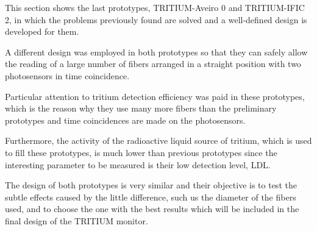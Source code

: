 This section shows the last prototypes, TRITIUM-Aveiro 0 and TRITIUM-IFIC 2, in which the problems previously found are solved and a well-defined design is developed for them.

A different design was employed in both prototypes so that they can safely allow the reading of a large number of fibers arranged in a straight position with two photosensors in time coincidence.

Particular attention to tritium detection efficiency was paid in these prototypes, which is the reason why they use many more fibers than the preliminary prototypes and time coincidences are made on the photosensors.

Furthermore, the activity of the radioactive liquid source of tritium, which is used to fill these prototypes, is much lower than previous prototypes since the interesting parameter to be measured is their low detection level, LDL.

The design of both prototypes is very similar and their objective is to test the subtle effects caused by the little difference, such us the diameter of the fibers used, and to choose the one with the best results which will be included in the final design of the TRITIUM monitor.